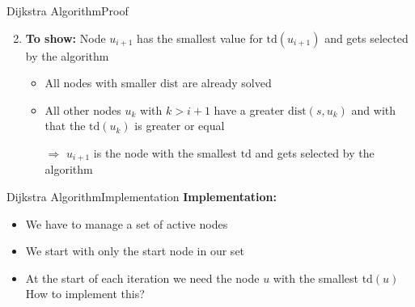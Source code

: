 \begin{frame}{Dijkstra Algorithm}{Proof}
  \begin{figure}[!h]
    \begin{adjustbox}{width=0.9\linewidth}
      \def\DijkstraTD{1}%
      
    \end{adjustbox}
  \end{figure}
  \begin{enumerate}
    \setcounter{enumi}{1}
    \item
      \textbf{To show:} Node {\color{MainA}$u_{i+1}$} has the smallest
      value for {\color{MainA}$\mathrm{td}(u_{i+1})$} and gets selected by
      the algorithm
      \begin{itemize}
        \item
          All nodes with smaller {\color{MainA}$\mathrm{dist}$} are
          already solved
        \item
          All other nodes {\color{MainA}$u_k$} with
          {\color{MainA}$k > i + 1$} have a greater
          {\color{MainA}$\mathrm{dist}(s, u_k)$}
          and with that the {\color{MainA}$\mathrm{td}(u_k)$} is greater
          or equal
        \item[$\Rightarrow$]
          {\color{MainA}$u_{i+1}$} is the node with the
          smallest {\color{MainA}$\mathrm{td}$} and gets selected by the
          algorithm
      \end{itemize}
  \end{enumerate}
\end{frame}


\begin{frame}{Dijkstra Algorithm}{Implementation}
  \textbf{Implementation:}
  \begin{itemize}
    \item
      We have to manage a set of {\color{MainA}active nodes}
    \item
      We start with only the {\color{MainA}start node} in our set
    \item
      At the start of each iteration we need the node
      {\color{MainA}$u$} with the smallest
      {\color{MainA}$\mathrm{td}(u)$}\\[0.5em]
      {\color{gray}How to implement this?}
  \end{itemize}
\end{frame}


